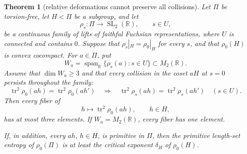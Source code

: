 \documentclass[11pt,reqno]{amsart}
\newtheorem{theorem}{Theorem}[section]
\theoremstyle{definition}
\theoremstyle{remark}
\newcommand{\R}{\mathbb R}
\newcommand{\Tr}{\operatorname{tr}}
\newcommand{\Span}{\operatorname{span}}
\newcommand{\SL}{\operatorname{SL}}
\begin{document}
\begin{theorem}[relative deformations cannot preserve all collisions]
\label{thm:relative-deformation}
Let \(\Pi\) be torsion-free, let \(H<\Pi\) be a subgroup, and let
\[
 \rho_s\colon\Pi\longrightarrow\SL_2(\R),\qquad s\in U,
\]
be a continuous family of lifts of faithful Fuchsian representations,
where \(U\) is connected and contains \(0\).  Suppose that
\(\rho_s|_H=\rho_0|_H\) for every \(s\), and that \(\rho_0(H)\) is convex
cocompact.  For \(a\in\Pi\), put
\[
 W_a=\Span_\R\{\rho_s(a):s\in U\}\subset M_2(\R).
\]
Assume that \(\dim W_a\ge3\) and that every collision in the coset \(aH\)
at \(s=0\) persists throughout the family:
\[
 \Tr^2\rho_0(ah)=\Tr^2\rho_0(ah')
 \quad\Longrightarrow\quad
 \Tr^2\rho_s(ah)=\Tr^2\rho_s(ah')
 \quad(s\in U).
\tag{13.4}
\]
Then every fiber of
\[
 h\longmapsto\Tr^2\rho_0(ah),\qquad h\in H,
\]
has at most three elements.  If \(W_a=M_2(\R)\), every fiber has one
element.

If, in addition, every \(ah\), \(h\in H\), is primitive in \(\Pi\), then
the primitive length-set entropy of \(\rho_0(\Pi)\) is at least the critical
exponent \(\delta_H\) of \(\rho_0(H)\).
\end{theorem}
\end{document}
